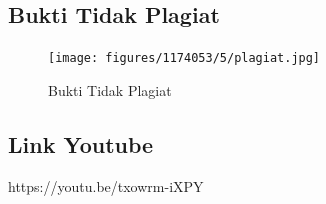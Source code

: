 \subsection{Bukti Tidak Plagiat}
\begin{figure}[H]
	\texttt{[image: figures/1174053/5/plagiat.jpg]}
	\centering
	\caption{Bukti Tidak Plagiat}
\end{figure}

\subsection{Link Youtube}
https://youtu.be/txowrm-iXPY